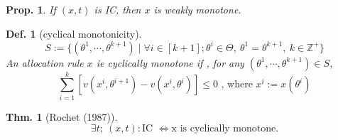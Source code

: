 \documentclass[11pt,a4paper,dvipdfmx]{article}
\theoremstyle{plain}
\newtheorem{thm}{Thm.}[section]
\newtheorem{prop}{Prop.}[section]
\newtheorem{df}{Def.}[section]
\newcommand{\Z}{\mathbb{Z}}
\newcommand{\equi}{\Longleftrightarrow}
\newcommand{\1}{\mathbbm{1}}
\begin{document}
\begin{prop}
	If $(x,t)$ is IC, then $x$ is weakly monotone.
\end{prop}

\begin{df}[cyclical monotonicity]
	\[
	S := \{(\theta^1, \cdots, \theta^{k+1}) \mid \forall i \in [k+1]; \theta^i \in \Theta, \ \theta^1 = \theta^{k+1}, \ k \in \Z^+ \}
	\]
	An allocation rule $x$ ie cyclically monotone if
	, for any $(\theta^1, \cdots, \theta^{k+1}) \in S$, 
	\begin{equation}
		\sum_{i=1}^k [v(x^{i}, \theta^{i+1}) - v(x^{i}, \theta^{i})] \leq 0
		\text{ , where $x^i := x(\theta^i)$}
		\tag{CM} \label{cm}
	\end{equation}
\end{df}

\begin{thm}[Rochet (1987)]
	\[
	\exists t; \ (x,t): \text{IC } \equi \text{x is cyclically monotone}.
	\]
\end{thm}
\end{document}
